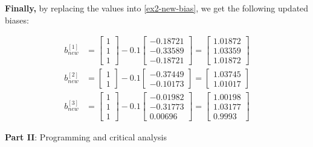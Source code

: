 \documentclass[12pt]{article}
\begin{document}
\begin{enumerate}[leftmargin=\labelsep]
          \textbf{Finally,} by replacing the values into \eqref{ex2-new-bias}, we get the following updated biases:

          \vskip -0.2cm
          \begin{align*}
              b^{[1]}_{new} &= \begin{bmatrix} 1 \\ 1 \\ 1 \end{bmatrix} - 0.1 \begin{bmatrix} -0.18721 \\ -0.33589 \\ -0.18721\end{bmatrix}
                  = \begin{bmatrix} 1.01872 \\ 1.03359 \\ 1.01872\end{bmatrix} \\
              b^{[2]}_{new} &= \begin{bmatrix} 1\\ 1\end{bmatrix} - 0.1 \begin{bmatrix} -0.37449 \\ -0.10173\end{bmatrix}
                  = \begin{bmatrix} 1.03745 \\ 1.01017\end{bmatrix} \\
              b^{[3]}_{new} &= \begin{bmatrix} 1 \\ 1 \\ 1\end{bmatrix} - 0.1 \begin{bmatrix} -0.01982 \\ -0.31773 \\ 0.00696\end{bmatrix}
                  = \begin{bmatrix} 1.00198 \\ 1.03177 \\ 0.9993\end{bmatrix}
          \end{align*}
\end{enumerate}

\pagebreak

\begin{center}
\large{\textbf{Part II}: Programming and critical analysis}\normalsize
\end{center}
\end{document}
